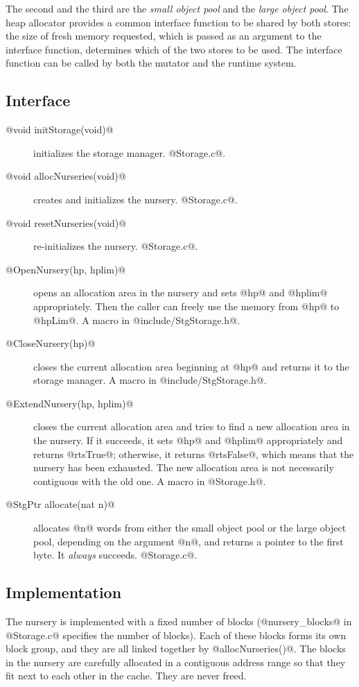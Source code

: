 \documentclass{article}
\begin{document}
The second and the third are the \emph{small object pool} and the
\emph{large object pool}.
The heap allocator provides a common interface function to be shared by both stores:
the size of fresh memory requested, which is passed as an argument to the 
interface function, determines which of the two stores to be used.
The interface function can be called by both the mutator and the runtime system.

\subsection{Interface}

\begin{description}
\item[@void initStorage(void)@] initializes the storage manager. @Storage.c@.
\item[@void allocNurseries(void)@] creates and initializes the nursery. 
@Storage.c@.
\item[@void resetNurseries(void)@] re-initializes the nursery. @Storage.c@.
\item[@OpenNursery(hp, hplim)@] opens an allocation area in the nursery and sets 
@hp@ and @hplim@ appropriately. 
Then the caller can freely use the memory from @hp@ to @hpLim@. 
A macro in @include/StgStorage.h@.
\item[@CloseNursery(hp)@] closes the current allocation area beginning at @hp@
and returns it to the storage manager.
A macro in @include/StgStorage.h@.
\item[@ExtendNursery(hp, hplim)@] closes the current allocation area and 
tries to find a new allocation area in the nursery. 
If it succeeds, it sets @hp@ and @hplim@ appropriately and returns @rtsTrue@; 
otherwise, it returns @rtsFalse@,
which means that the nursery has been exhausted. 
The new allocation area is not necessarily contiguous with the old one.
A macro in @Storage.h@.
\item[@StgPtr allocate(nat n)@] allocates @n@ words from either the small
object pool or the large object pool, depending on the argument @n@, 
and returns a pointer to the first byte. It \emph{always} succeeds.
@Storage.c@.
\end{description}

\subsection{Implementation}

The nursery is implemented with a fixed number of blocks (@nursery_blocks@
in @Storage.c@ specifies the number of blocks). 
Each of these blocks forms its own block group, and they are all linked together
by @allocNurseries()@. 
The blocks in the nursery are carefully allocated in a contiguous address
range so that they fit next to each other in the cache.
They are never freed. 
\end{document}
